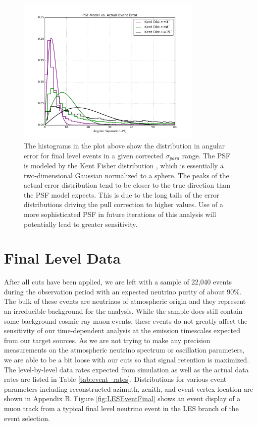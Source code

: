 \documentclass{gatech-thesis}
\begin{document}
\begin{figure}[ht]
  \begin{center}
    \includegraphics[width=0.8\textwidth,keepaspectratio]{CorrectSigmaVsKentDistribution_Multi_Nu.png}
  \end{center}
  \caption[Event PSF Modeling]{The histograms in the plot above show the distribution in angular error for final level events in a given corrected $\sigma_{para}$ range. The PSF is modeled by the Kent Fisher distribution \cite{1982}, which is essentially a two-dimensional Gaussian normalized to a sphere. The peaks of the actual error distribution tend to be closer to the true direction than the PSF model expects. This is due to the long tails of the error distributions driving the pull correction to higher values. Use of a more sophisticated PSF in future iterations of this analysis will potentially lead to greater sensitivity.}
  \label{fig:PSFModel}
\end{figure}

\section{Final Level Data}
After all cuts have been applied, we are left with a sample of 22,040 events during the observation period with an expected neutrino purity of about 90$\%$. The bulk of these events are neutrinos of atmospheric origin and they represent an irreducible background for the analysis. While the sample does still contain some background cosmic ray muon events, these events do not greatly affect the sensitivity of our time-dependent analysis at the emission timescales expected from our target sources. As we are not trying to make any precision measurements on the atmospheric neutrino spectrum or oscillation parameters, we are able to be a bit loose with our cuts so that signal retention is maximized. The level-by-level data rates expected from simulation as well as the actual data rates are listed in Table \ref{tab:event_rates}. Distributions for various event parameters including reconstructed azimuth, zenith, and event vertex location are shown in Appendix B. Figure \ref{fig:LESEventFinal} shows an event display of a muon track from a typical final level neutrino event in the LES branch of the event selection. 
\end{document}

